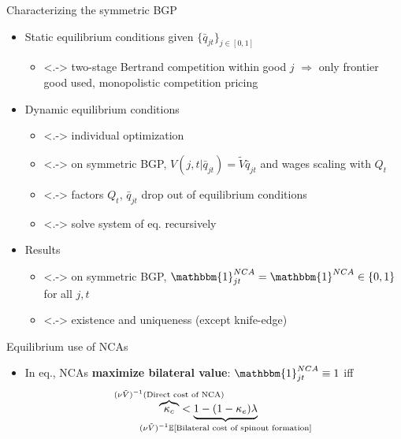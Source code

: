 \documentclass[english,usenames,dvipsnames,handout]{beamer}
\begin{document}
\begin{frame}{Characterizing the symmetric BGP}\label{closing_the_model}
	\begin{itemize}
		\item<+-> Static equilibrium conditions given $\{\bar{q}_{jt}\}_{j \in [0,1]}$ \hyperlink{static_eq_conditions}{}
		\begin{itemize}
			\item<.-> two-stage Bertrand competition within good $j$ $\Rightarrow$ only frontier good used, monopolistic competition pricing \hyperlink{two_stage_bertrand}{}
		\end{itemize}
		\medskip
		\item<+-> Dynamic equilibrium conditions
		\begin{itemize}
			\item<.-> individual optimization \hyperlink{HJB_incumbent}{} \hyperlink{household_optimization}{} 
			\item<.-> on symmetric BGP, $V(j,t|\bar{q}_{jt}) = \tilde{V} \bar{q}_{jt}$ and wages scaling with $Q_t$  \hyperlink{proposition:hjb_scaling}{} 
			\item<.-> factors $Q_t$, $\bar{q}_{jt}$ drop out of equilibrium conditions 
			\item<.-> solve system of eq. recursively 
			\hyperlink{eq_innovation_and_growth}{} 
		\end{itemize}
		\medskip
		\item<+-> Results 
		\begin{itemize}
			\item<.-> on symmetric BGP, $\mathbbm{1}^{NCA}_{jt} = \mathbbm{1}^{NCA} \in \{0,1\}$ for all $j,t$
			\item<.-> existence and uniqueness (except knife-edge) \hyperlink{existence_and_uniqueness}{} 
		\end{itemize}
	\end{itemize}
\end{frame}

\begin{frame}{Equilibrium use of NCAs}\label{use_of_ncas}
	\begin{itemize}
		\item In eq., NCAs \alert{\textbf{maximize bilateral value}}: $\mathbbm{1}^{NCA}_{jt} \equiv 1$ iff
		\begin{align*}
		\overbrace{\kappa_c}^{\mathclap{(\nu \tilde{V})^{-1} (\text{Direct cost of NCA})}} &< \underbrace{1 - (1-\kappa_e) \lambda}_{\mathclap{(\nu\tilde{V})^{-1}\mathbb{E}[\text{Bilateral cost of spinout formation}]}}
		\end{align*}
		\hyperlink{use_of_ncas_details}{}
	\end{itemize}
\end{frame}
\end{document}
